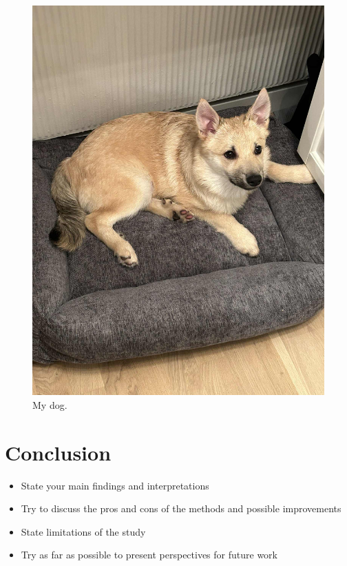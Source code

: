 \documentclass[amssymb,twocolumn,aps]{revtex4}
\begin{document}
\begin{figure}[h]
    \centering
    \includegraphics[width=0.5\linewidth]{Figures/puppy.jpg}
    \caption{My dog.}
    \label{fig:puppy}
\end{figure}


\section{Conclusion}\label{section:conclusion}
\begin{itemize}
    \item State your main findings and interpretations
    \item Try to discuss the pros and cons of the methods and possible improvements
    \item State limitations of the study
    \item Try as far as possible to present perspectives for future work
\end{itemize}


\end{document}

